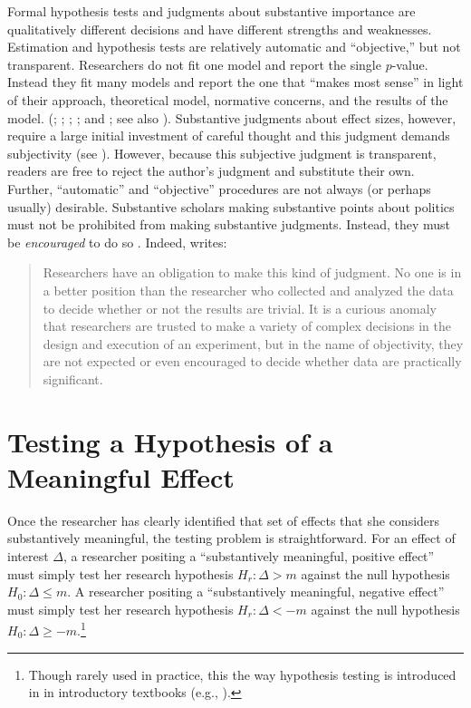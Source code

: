 \documentclass[12pt]{article}
\begin{document}
Formal hypothesis tests and judgments about substantive importance are qualitatively different decisions and have different strengths and weaknesses. Estimation and hypothesis tests are relatively automatic and ``objective,'' but not transparent. Researchers do not fit one model and report the single $p$-value. Instead they fit many models and report the one that ``makes most sense'' in light of their approach, theoretical model, normative concerns, and the results of the model. (\citealt{GerberMalhotra2008}; \citealt{SimmonsNelsonSimonsohn2011}; \citealt{Francis2013}; \citealt{SimmonsNelsonSimonsohn2014}; and \citealt{EsareyWu2014}; see also \citealt{GelmanLoken2014}). Substantive judgments about effect sizes, however, require a large initial investment of careful thought and this judgment demands subjectivity (see \citealt{Rainey2014}). However, because this subjective judgment is transparent, readers are free to reject the author's judgment and substitute their own. Further, ``automatic'' and ``objective'' procedures are not always (or perhaps usually) desirable. Substantive scholars making substantive points about politics must not be prohibited from making substantive judgments. Instead, they must be \emph{encouraged} to do so \citep{Achen1982}. Indeed, \citet[p. 755]{Kirk1996} writes:

\begin{quote}
Researchers have an obligation to make this kind of judgment. No one is in a better position than the researcher who collected and analyzed the data to decide whether or not the results are trivial. It is a curious anomaly that researchers are trusted to make a variety of complex decisions in the design and execution of an experiment, but in the name of objectivity, they are not expected or even encouraged to decide whether data are practically significant.
\end{quote}


\section*{Testing a Hypothesis of a Meaningful Effect}

Once the researcher has clearly identified that set of effects that she considers substantively meaningful, the testing problem is straightforward. For an effect of interest $\Delta$, a researcher positing a ``substantively meaningful, positive effect'' must simply test her research hypothesis $H_r: \Delta > m$ against the null hypothesis $H_0: \Delta \leq m$. A researcher positing a ``substantively meaningful, negative effect'' must simply test her research hypothesis $H_r: \Delta < -m$ against the null hypothesis $H_0: \Delta \geq -m$.\footnote{\normalbaselineskip Though rarely used in practice, this the way hypothesis testing is introduced in in introductory textbooks (e.g., \citealt{WonnacottWonnacott1990}).}
\end{document}
